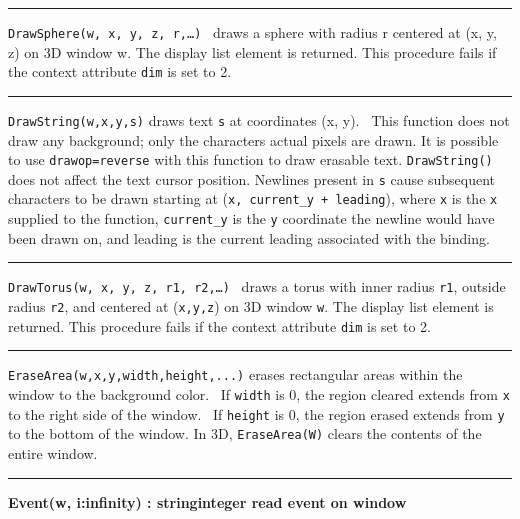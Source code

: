 \bigskip\hrule\vspace{0.1cm}

\noindent
\texttt{DrawSphere(w, x, y, z, r,{\dots})} \ draws a sphere with radius
r centered at (x, y, z) on 3D window w. The display list element is
returned. This procedure fails if the context attribute \texttt{dim} is
set to 2.

\bigskip\hrule\vspace{0.1cm}

\noindent
\texttt{DrawString(w,x,y,s)} draws text \texttt{s} at coordinates (x,
y). \ This function does not draw any background; only the
characters{\textquotesingle} actual pixels are drawn. It is possible to
use \texttt{{\textquotedbl}drawop=reverse{\textquotedbl}} with this
function to draw erasable text. \texttt{DrawString()} does not affect
the text cursor position. Newlines present in \texttt{s} cause
subsequent characters to be drawn starting at (\texttt{x, current\_y +
leading}), where \texttt{x} is the \texttt{x} supplied to the function,
\texttt{current\_y} is the \texttt{y} coordinate the newline would have
been drawn on, and leading is the current leading associated with the
binding.

\bigskip\hrule\vspace{0.1cm}

\noindent
\texttt{DrawTorus(w, x, y, z, r1, r2,{\dots})} \ draws a torus with
inner radius \texttt{r1}, outside radius \texttt{r2}, and centered at
(\texttt{x,y,z}) on 3D window \texttt{w}. The display list element is
returned. This procedure fails if the context attribute \texttt{dim} is
set to 2.

\bigskip\hrule\vspace{0.1cm}

\noindent
\texttt{EraseArea(w,x,y,width,height,...)} erases rectangular areas
within the window to the background color. \ If \texttt{width} is 0,
the region cleared extends from \texttt{x} to the right side of the
window. \ If \texttt{height} is 0, the region erased extends from
\texttt{y} to the bottom of the window. In 3D, \texttt{EraseArea(W)}
clears the contents of the entire window.

\bigskip\hrule\vspace{0.1cm}
\noindent
{\bf Event(w, i:infinity) : string{\textbar}integer \hfill
 read event on window}

